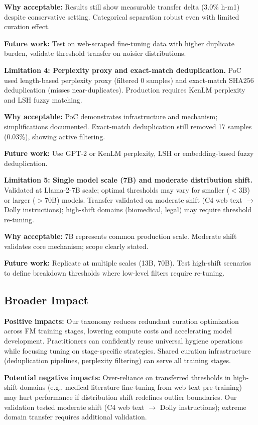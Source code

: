 \textbf{Why acceptable:} Results still show measurable transfer delta (3.0\% h-m1) despite conservative setting. Categorical separation robust even with limited curation effect.

\textbf{Future work:} Test on web-scraped fine-tuning data with higher duplicate burden, validate threshold transfer on noisier distributions.

\textbf{Limitation 4: Perplexity proxy and exact-match deduplication.} PoC used length-based perplexity proxy (filtered 0 samples) and exact-match SHA256 deduplication (misses near-duplicates). Production requires KenLM perplexity and LSH fuzzy matching.

\textbf{Why acceptable:} PoC demonstrates infrastructure and mechanism; simplifications documented. Exact-match deduplication still removed 17 samples (0.03\%), showing active filtering.

\textbf{Future work:} Use GPT-2 or KenLM perplexity, LSH or embedding-based fuzzy deduplication.

\textbf{Limitation 5: Single model scale (7B) and moderate distribution shift.} Validated at Llama-2-7B scale; optimal thresholds may vary for smaller ($<$3B) or larger ($>$70B) models. Transfer validated on moderate shift (C4 web text $\rightarrow$ Dolly instructions); high-shift domains (biomedical, legal) may require threshold re-tuning.

\textbf{Why acceptable:} 7B represents common production scale. Moderate shift validates core mechanism; scope clearly stated.

\textbf{Future work:} Replicate at multiple scales (13B, 70B). Test high-shift scenarios to define breakdown thresholds where low-level filters require re-tuning.

\subsection{Broader Impact}

\textbf{Positive impacts:} Our taxonomy reduces redundant curation optimization across FM training stages, lowering compute costs and accelerating model development. Practitioners can confidently reuse universal hygiene operations while focusing tuning on stage-specific strategies. Shared curation infrastructure (deduplication pipelines, perplexity filtering) can serve all training stages.

\textbf{Potential negative impacts:} Over-reliance on transferred thresholds in high-shift domains (e.g., medical literature fine-tuning from web text pre-training) may hurt performance if distribution shift redefines outlier boundaries. Our validation tested moderate shift (C4 web text $\rightarrow$ Dolly instructions); extreme domain transfer requires additional validation.

